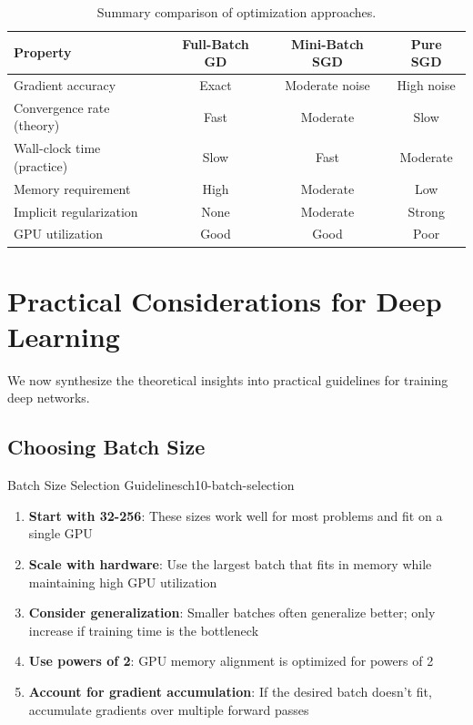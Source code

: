 \documentclass[../../main.tex]{subfiles}
\begin{document}
\begin{table}[htbp]
\centering
\caption{Summary comparison of optimization approaches.}
\label{tab:ch10-comparison}
\begin{tabular}{@{}lccc@{}}
\toprule
\textbf{Property} & \textbf{Full-Batch GD} & \textbf{Mini-Batch SGD} & \textbf{Pure SGD} \\
\midrule
Gradient accuracy & Exact & Moderate noise & High noise \\
Convergence rate (theory) & Fast & Moderate & Slow \\
Wall-clock time (practice) & Slow & Fast & Moderate \\
Memory requirement & High & Moderate & Low \\
Implicit regularization & None & Moderate & Strong \\
GPU utilization & Good & Good & Poor \\
\bottomrule
\end{tabular}
\end{table}

\section{Practical Considerations for Deep Learning}
\label{sec:ch10-practical}

We now synthesize the theoretical insights into practical guidelines for training deep networks.

\subsection{Choosing Batch Size}

\begin{definition}{Batch Size Selection Guidelines}{ch10-batch-selection}
\begin{enumerate}
    \item \textbf{Start with 32-256}: These sizes work well for most problems and fit on a single GPU

    \item \textbf{Scale with hardware}: Use the largest batch that fits in memory while maintaining high GPU utilization

    \item \textbf{Consider generalization}: Smaller batches often generalize better; only increase if training time is the bottleneck

    \item \textbf{Use powers of 2}: GPU memory alignment is optimized for powers of 2

    \item \textbf{Account for gradient accumulation}: If the desired batch doesn't fit, accumulate gradients over multiple forward passes
\end{enumerate}
\end{definition}
\end{document}
